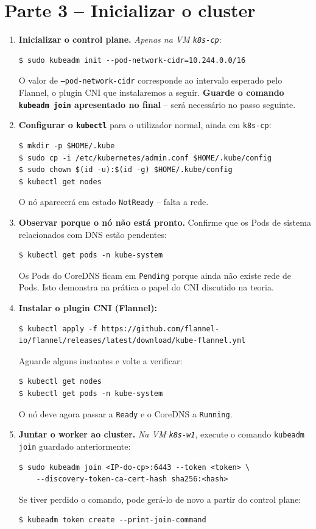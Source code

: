 \documentclass[11pt,a4paper]{article}
\begin{document}
\section{Parte 3 -- Inicializar o cluster}
\begin{enumerate}[label=\arabic*.,resume]

  \item \textbf{Inicializar o control plane.} \emph{Apenas na VM \texttt{k8s-cp}}:
\begin{lstlisting}
$ sudo kubeadm init --pod-network-cidr=10.244.0.0/16
\end{lstlisting}
  O valor de \texttt{--pod-network-cidr} corresponde ao intervalo esperado pelo Flannel, o plugin CNI que instalaremos a seguir. \textbf{Guarde o comando \texttt{kubeadm join} apresentado no final} -- será necessário no passo seguinte.

  \item \textbf{Configurar o \texttt{kubectl}} para o utilizador normal, ainda em \texttt{k8s-cp}:
\begin{lstlisting}
$ mkdir -p $HOME/.kube
$ sudo cp -i /etc/kubernetes/admin.conf $HOME/.kube/config
$ sudo chown $(id -u):$(id -g) $HOME/.kube/config
$ kubectl get nodes
\end{lstlisting}
  O nó aparecerá em estado \texttt{NotReady} -- falta a rede.

  \item \textbf{Observar porque o nó não está pronto.} Confirme que os Pods de sistema relacionados com DNS estão pendentes:
\begin{lstlisting}
$ kubectl get pods -n kube-system
\end{lstlisting}
  Os Pods do CoreDNS ficam em \texttt{Pending} porque ainda não existe rede de Pods. Isto demonstra na prática o papel do CNI discutido na teoria.

  \item \textbf{Instalar o plugin CNI (Flannel):}
\begin{lstlisting}
$ kubectl apply -f https://github.com/flannel-io/flannel/releases/latest/download/kube-flannel.yml
\end{lstlisting}
  Aguarde alguns instantes e volte a verificar:
\begin{lstlisting}
$ kubectl get nodes
$ kubectl get pods -n kube-system
\end{lstlisting}
  O nó deve agora passar a \texttt{Ready} e o CoreDNS a \texttt{Running}.

  \item \textbf{Juntar o worker ao cluster.} \emph{Na VM \texttt{k8s-w1}}, execute o comando \texttt{kubeadm join} guardado anteriormente:
\begin{lstlisting}
$ sudo kubeadm join <IP-do-cp>:6443 --token <token> \
    --discovery-token-ca-cert-hash sha256:<hash>
\end{lstlisting}
  Se tiver perdido o comando, pode gerá-lo de novo a partir do control plane:
\begin{lstlisting}
$ kubeadm token create --print-join-command
\end{lstlisting}


\end{enumerate}
\end{document}

